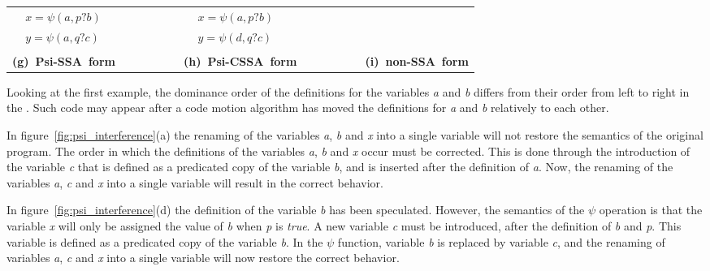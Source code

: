 \begin{figure*}
\begin{center}
\begin{tabular}{llllllll}
            & ${x = \psi(a,p?b)}$ & \ \ \ \ \ \ \ \  &     & ${x = \psi(a,p?b)}$  & \ \ \ \ \ \ \ \ &     & \\
            & ${y = \psi(a,q?c)}$ & \ \ \ \ \ \ \ \  &     & ${y = \psi(d,q?c)}$  & \ \ \ \ \ \ \ \ &     & \\
\\
\multicolumn{2}{l}{\bf (g)\ Psi-SSA\ form} & \ \ \ \ \ \ \ \  &\multicolumn{2}{l}{\bf (h)\ Psi-CSSA\ form} & \ \ \ \ \ \ \ \  &\multicolumn{2}{l}{\bf (i)\ non-SSA\ form} \\
\end{tabular}
\caption{$\psi$-SSA, $\psi$-CSSA forms and non-SSA form after destruction}
\label{fig:psi_interference}
\end{center}
\end{figure*}


Looking at the first example, the dominance order of the definitions
for the variables \textit{a} and \textit{b} differs from their order from
left to right in the \psifun. Such code may appear after a
code motion algorithm has moved the definitions for \textit{a} and
\textit{b} relatively to each other.


In figure~\ref{fig:psi_interference}(a) the renaming of the variables
\textit{a}, \textit{b} and \textit{x} into a single variable will not restore
the semantics of the original program. The order in which the
definitions of the variables \textit{a}, \textit{b} and \textit{x} occur must
be corrected. This is done through the introduction of the variable
\textit{c} that is defined as a predicated copy of the variable \textit{b},
and is inserted after the definition of \textit{a}. Now, the renaming of
the variables \textit{a}, \textit{c} and \textit{x} into a single variable will
result in the correct behavior.

In figure~\ref{fig:psi_interference}(d) the definition of the variable
\textit{b} has been speculated. However, the semantics of the $\psi$
operation is that the variable \textit{x} will only be assigned the value
of \textit{b} when \textit{p} is \textit{true}. A new variable \textit{c} must be
introduced, after the definition of \textit{b} and \textit{p}. This variable
is defined as a predicated copy of the variable \textit{b}. In the
${\psi}$ function, variable \textit{b} is replaced by variable \textit{c},
and the renaming of variables \textit{a}, \textit{c} and \textit{x} into a
single variable will now restore the correct behavior.

